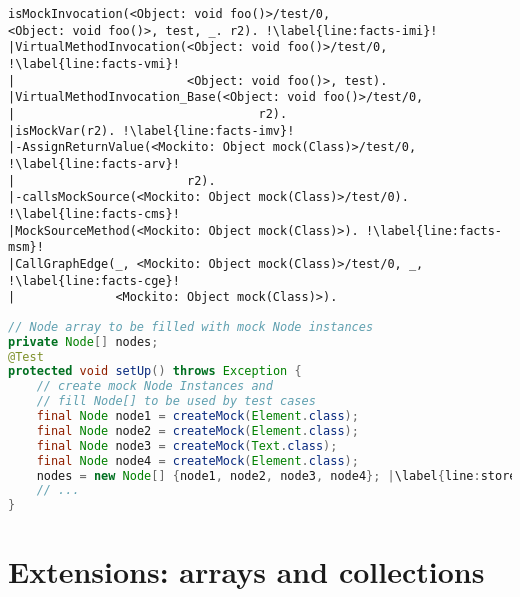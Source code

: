 \begin{lstlisting}[basicstyle=\ttfamily, caption={Facts about invocation \texttt{r2.foo()} in method \texttt{test}.},
basicstyle=\ttfamily, framesep=4.5mm, framexleftmargin=1.0mm, captionpos=b, label=lis:facts, escapechar=!, morekeywords={@Test}]
isMockInvocation(<Object: void foo()>/test/0, 
<Object: void foo()>, test, _. r2). !\label{line:facts-imi}!
|VirtualMethodInvocation(<Object: void foo()>/test/0, !\label{line:facts-vmi}!
|                        <Object: void foo()>, test).
|VirtualMethodInvocation_Base(<Object: void foo()>/test/0, 
|                                  r2).
|isMockVar(r2). !\label{line:facts-imv}!
|-AssignReturnValue(<Mockito: Object mock(Class)>/test/0, !\label{line:facts-arv}!
|                        r2). 
|-callsMockSource(<Mockito: Object mock(Class)>/test/0). !\label{line:facts-cms}!
|MockSourceMethod(<Mockito: Object mock(Class)>). !\label{line:facts-msm}!
|CallGraphEdge(_, <Mockito: Object mock(Class)>/test/0, _, !\label{line:facts-cge}!
|              <Mockito: Object mock(Class)>). 
\end{lstlisting}

\begin{lstlisting}[basicstyle=\ttfamily, caption={This example illustrates a field array container holding mock objects from \textit{setup()} in \texttt{NodeListIteratorTest.java}.},
basicstyle=\ttfamily,language = Java, framesep=4.5mm, framexleftmargin=1.0mm, captionpos=b, label=lis:container, escapechar=|, morekeywords={@Test}]
// Node array to be filled with mock Node instances
private Node[] nodes;
@Test
protected void setUp() throws Exception {
	// create mock Node Instances and 
	// fill Node[] to be used by test cases
	final Node node1 = createMock(Element.class);
	final Node node2 = createMock(Element.class);
	final Node node3 = createMock(Text.class);
	final Node node4 = createMock(Element.class);
	nodes = new Node[] {node1, node2, node3, node4}; |\label{line:storeMocksInArray}|
	// ...
}
\end{lstlisting}

\section{Extensions: arrays and collections} 

